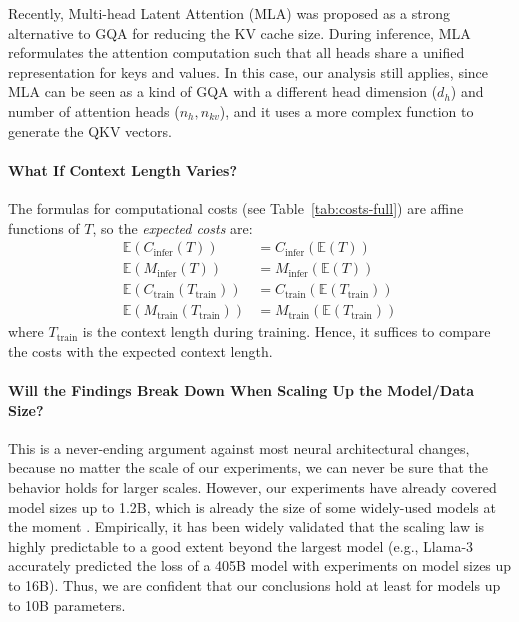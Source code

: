 Recently, Multi-head Latent Attention (MLA) \citep{deepseek-v2} was proposed as a strong alternative to GQA for reducing the KV cache size. During inference, MLA reformulates the attention computation such that all heads share a unified representation for keys and values. In this case, our analysis still applies, since MLA can be seen as a kind of GQA with a different head dimension ($d_h$) and number of attention heads ($n_h, n_{kv}$), and it uses a more complex function to generate the QKV vectors.

\paragraph{What If Context Length Varies?}

The formulas for computational costs (see Table~\ref{tab:costs-full}) are affine functions of $T$, so the \textit{expected costs} are:
\begin{align*}
\mathbb E(C_\text{infer}(T)) &= C_\text{infer}(\mathbb E(T)) \\
\mathbb E(M_\text{infer}(T)) &= M_\text{infer}(\mathbb E(T)) \\
\mathbb E (C_\text{train}(T_\text{train})) &= C_\text{train}(\mathbb E(T_\text{train}))\\
\mathbb E(M_\text{train}(T_\text{train})) &= M_\text{train}(\mathbb E(T_\text{train}))
\end{align*}
where $T_\text{train}$ is the context length during training.
Hence, it suffices to compare the costs with the expected context length. 

\paragraph{Will the Findings Break Down When Scaling Up the Model/Data Size?}

This is a never-ending argument against most neural architectural changes, because no matter the scale of our experiments, we can never be sure that the behavior holds for larger scales. However, our experiments have already covered model sizes up to 1.2B, which is already the size of some widely-used models at the moment \citep{llama3,qwen2.5}. Empirically, it has been widely validated that the scaling law is highly predictable to a good extent beyond the largest model (e.g., Llama-3 accurately predicted the loss of a 405B model with experiments on model sizes up to 16B). Thus, we are confident that our conclusions hold at least for models up to 10B parameters.

